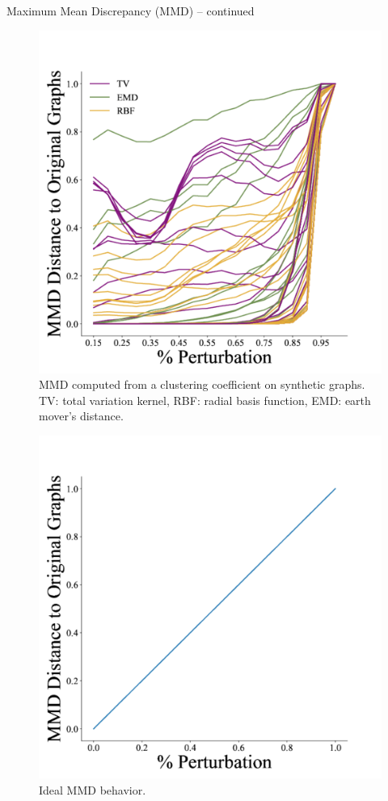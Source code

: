 \documentclass[aspectratio=169, 10pt, dvipsnames]{beamer}
\begin{document}
\begin{frame}[fragile]{Maximum Mean Discrepancy (MMD) -- continued}
\begin{minipage}{0.68\textwidth}
  \end{minipage}
  \hfill
  \begin{minipage}{0.28\textwidth}
  \begin{figure}
    \centering
    \includegraphics[width=.7\textwidth]{./figures/leslie_work.pdf}
    \caption{MMD computed from a clustering coefficient on synthetic graphs. TV:
    total variation kernel, RBF: radial basis function, EMD: earth mover's distance.}
\end{figure}
\vspace{-14pt}
  \begin{figure}
    \centering
    \includegraphics[width=.7\textwidth]{./figures/ideal.pdf}
    \caption{Ideal MMD behavior.}
  \end{figure}
  \end{minipage}
\end{frame}
\end{document}
